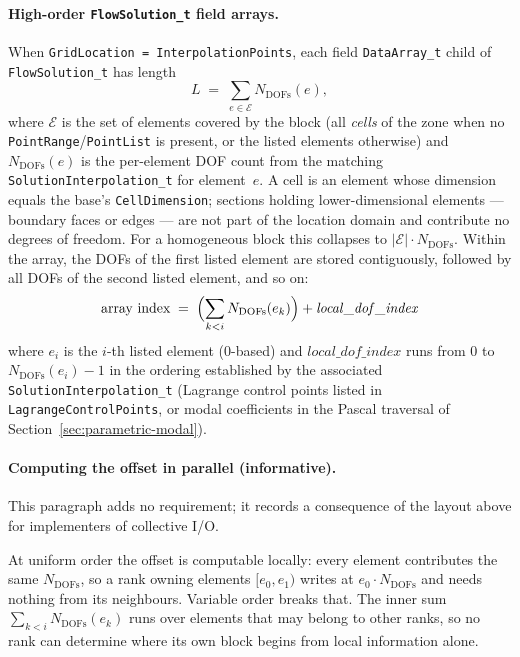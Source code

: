 \documentclass[11pt,letterpaper]{article}
\newif\ifvfourdraft
\newcommand{\vfour}[1]{\ifvfourdraft\textcolor{v4violet}{#1}\else#1\fi}
\newcommand{\vfourmark}{\ifvfourdraft\textcolor{v4violet}{\textbf{[v4]}}\ \fi}
\begin{document}
\paragraph{High-order \texttt{FlowSolution\_t} field arrays.}
When \texttt{GridLocation = InterpolationPoints}, each field \texttt{DataArray\_t} child of
\texttt{FlowSolution\_t} has length
\begin{equation*}
  L \;=\; \sum_{e \in \mathcal{E}} N_\mathrm{DOFs}(e),
\end{equation*}
where $\mathcal{E}$ is the set of elements covered by the block
(\vfour{all \emph{cells} of the zone} when no
\texttt{PointRange}\allowbreak/\texttt{PointList} is present, or the listed elements
otherwise) and $N_\mathrm{DOFs}(e)$ is the per-element DOF count from the
matching \texttt{SolutionInterpolation\_t} for element~$e$.
\vfour{A cell is an element whose dimension equals the base's
\texttt{CellDimension}; sections holding lower-dimensional elements --- boundary
faces or edges --- are not part of the location domain and contribute no degrees
of freedom.}  For a homogeneous block this
collapses to $|\mathcal{E}| \cdot N_\mathrm{DOFs}$.  Within the array, the DOFs of
the first listed element are stored contiguously, followed by all DOFs of the
second listed element, and so on:
\begin{equation*}
  \text{array index} \;=\;
    \Bigl( \sum_{k < i} N_\mathrm{DOFs}(e_k) \Bigr) + \mathit{local\_dof\_index}
\end{equation*}
where $e_i$ is the $i$-th listed element (0-based) and $\mathit{local\_dof\_index}$
runs from $0$ to $N_\mathrm{DOFs}(e_i)-1$ in the ordering established by the associated
\texttt{SolutionInterpolation\_t} (Lagrange control points listed in
\texttt{LagrangeControlPoints}, or modal coefficients in the Pascal traversal of
Section~\ref{sec:parametric-modal}).

\paragraph{\vfourmark Computing the offset in parallel (informative).}
This paragraph adds no requirement; it records a consequence of the layout above
for implementers of collective I/O.

At uniform order the offset is computable locally: every element contributes the
same $N_\mathrm{DOFs}$, so a rank owning elements $[e_0, e_1)$ writes at
$e_0 \cdot N_\mathrm{DOFs}$ and needs nothing from its neighbours.  Variable order
breaks that.  The inner sum $\sum_{k<i} N_\mathrm{DOFs}(e_k)$ runs over elements
that may belong to other ranks, so no rank can determine where its own block
begins from local information alone.
\end{document}
